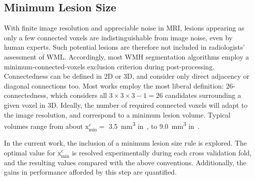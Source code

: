 \subsection{Minimum Lesion Size}\label{ss:vlr-minx}
With finite image resolution and appreciable noise in MRI,
lesions appearing as only a few connected voxels are indistinguishable from image noise,
even by human experts.
Such potential lesions are therefore not included in radiologists' assessment of WML.
Accordingly, most WMH segmentation algorithms employ
a minimum-connected-voxels exclusion criterion during post-processing.
Connectedness can be defined in 2D or 3D,
and consider only direct adjacency or diagonal connections too.
Most works employ the most liberal definition: 26-connectedness,
which considers all $3\times3\times3-1=26$ candidates surrounding a given voxel in 3D.
Ideally, the number of required connected voxels will adapt to the image resolution,
and correspond to a minimum lesion volume.
Typical volumes range from about $\mathrm{x}_{\min}^{c} = $
\SI{3.5}{\milli\metre\cubed} in~\cite{Steenwijk2013,Fartaria2015}, to
\SI{9.0}{\milli\metre\cubed} in~\cite{Yoo2014,Elliott2013}.
\par
In the current work, the inclusion of a minimum lesion size rule is explored.
The optimal value for $\mathrm{x}_{\min}^{c}$ is resolved experimentally
during each cross validation fold, and the resulting values compared with the above conventions.
Additionally, the gains in performance afforded by this step are quantified.

